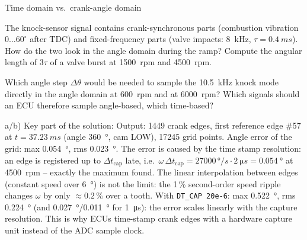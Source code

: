 \begin{exercise}{Time domain vs.\ crank-angle domain}{\Wokwi}
\begin{tasks}
  \item The knock-sensor signal contains crank-synchronous parts (combustion
    vibration $0\dots60^\circ$ after TDC) and fixed-frequency parts (valve
    impacts: \SI{8}{kHz}, $\tau=\SI{0.4}{ms}$). How do the two look in the
    angle domain during the ramp? Compute the angular length of $3\tau$ of a
    valve burst at \SI{1500}{rpm} and \SI{4500}{rpm}.
  \item Which angle step $\Delta\theta$ would be needed to sample the
    \SI{10.5}{kHz} knock mode directly in the angle domain at \SI{600}{rpm}
    and at \SI{6000}{rpm}? Which signals should an ECU therefore sample
    angle-based, which time-based?
\end{tasks}
\end{exercise}

\begin{solution}
a/b) Key part of the solution:
Output: 1449 crank edges, first reference edge \#57 at $t=\SI{37.23}{ms}$
(angle \SI{360}{\degree}, cam LOW), 17245 grid points. Angle error of the grid:
max \SI{0.054}{\degree}, rms \SI{0.023}{\degree}. The error is caused by the
time stamp resolution: an edge is registered up to $\Delta t_\mathrm{cap}$
late, i.e.\ $\omega\,\Delta t_\mathrm{cap}=27000\,\si{\degree/s}\cdot\SI{2}{\micro s}=\SI{0.054}{\degree}$
at \SI{4500}{rpm} -- exactly the maximum found. The linear interpolation
between edges (constant speed over \SI{6}{\degree}) is not the limit: the 1\,\%
second-order speed ripple changes $\omega$ by only $\approx0.2\,\%$ over a
tooth. With \texttt{DT\_CAP 20e-6}: max \SI{0.522}{\degree}, rms
\SI{0.224}{\degree} (and \SI{0.027}{\degree}/\SI{0.011}{\degree} for
\SI{1}{\micro s}): the error scales linearly with the capture resolution.
This is why ECUs time-stamp crank edges with a hardware capture unit instead
of the ADC sample clock.


\end{solution}
